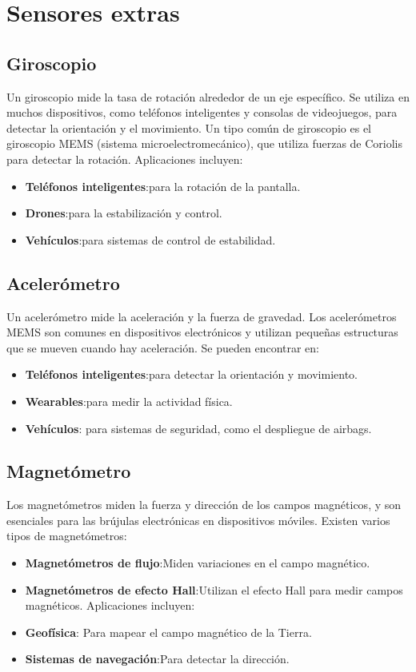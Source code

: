 \section{Sensores extras}
\subsection{Giroscopio}
Un giroscopio mide la tasa de rotación alrededor de un eje específico. Se utiliza en muchos dispositivos, como teléfonos inteligentes y consolas de videojuegos, para detectar la orientación y el movimiento. Un tipo común de giroscopio es el giroscopio MEMS (sistema microelectromecánico), que utiliza fuerzas de Coriolis para detectar la rotación. Aplicaciones incluyen:
\begin{itemize}
	\item \textbf{Teléfonos inteligentes}:para la rotación de la pantalla.
	\item \textbf{Drones}:para la estabilización y control.
	\item \textbf{Vehículos}:para sistemas de control de estabilidad.
	
\end{itemize}
\subsection{Acelerómetro}
Un acelerómetro mide la aceleración y la fuerza de gravedad. Los acelerómetros MEMS son comunes en dispositivos electrónicos y utilizan pequeñas estructuras que se mueven cuando hay aceleración. Se pueden encontrar en:
\begin{itemize}
	\item \textbf{Teléfonos inteligentes}:para detectar la orientación y movimiento.
	\item \textbf{Wearables}:para medir la actividad física.
	\item \textbf{Vehículos}: para sistemas de seguridad, como el despliegue de airbags.
	
\end{itemize}
\subsection{Magnetómetro}
Los magnetómetros miden la fuerza y dirección de los campos magnéticos, y son esenciales para las brújulas electrónicas en dispositivos móviles. Existen varios tipos de magnetómetros:
\begin{itemize}
	\item \textbf{Magnetómetros de flujo}:Miden variaciones en el campo magnético.
	\item \textbf{Magnetómetros de efecto Hall}:Utilizan el efecto Hall para medir campos magnéticos. Aplicaciones incluyen:
	\item \textbf{Geofísica}: Para mapear el campo magnético de la Tierra.
	\item \textbf{Sistemas de navegación}:Para detectar la dirección.
	
\end{itemize}
